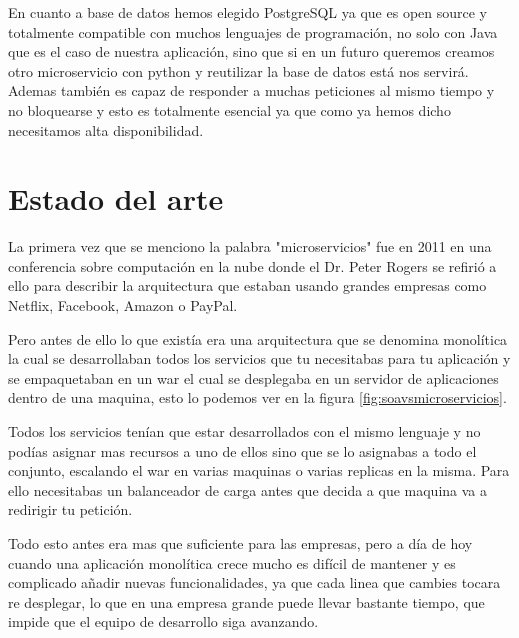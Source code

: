 \documentclass[12pt]{report} %
\begin{document}
	En cuanto a base de datos hemos elegido PostgreSQL ya que es open source y totalmente compatible con muchos lenguajes de programación, no solo con Java que es el caso de nuestra aplicación, sino que si en un futuro queremos creamos otro microservicio con python y reutilizar la base de datos está nos servirá.
	Ademas también es capaz de responder a muchas peticiones al mismo tiempo y no bloquearse y esto es totalmente esencial ya que como ya hemos dicho necesitamos alta disponibilidad.
	 
	\section{Estado del arte}
	
	La primera vez que se menciono la palabra "microservicios" fue en 2011 en una conferencia sobre computación en la nube donde el Dr. Peter Rogers\cite{breveHistoria} se refirió a ello para describir la arquitectura que estaban usando grandes empresas como Netflix, Facebook, Amazon o PayPal. 

	Pero antes de ello lo que existía era una arquitectura que se denomina monolítica la cual se desarrollaban todos los servicios que tu necesitabas para tu aplicación y se empaquetaban en un war el cual se desplegaba en un servidor de aplicaciones dentro de una maquina, esto lo podemos ver en la figura \ref{fig:soavsmicroservicios}.
	
	Todos los servicios tenían que estar desarrollados con el mismo lenguaje y no podías asignar mas recursos a uno de ellos sino que se lo asignabas a todo el conjunto, escalando el war en varias maquinas o varias replicas en la misma. Para ello necesitabas un balanceador de carga antes que decida a que maquina va a redirigir tu petición.
	
	Todo esto antes era mas que suficiente para las empresas, pero a día de hoy cuando una aplicación monolítica crece mucho es difícil de mantener y es complicado añadir nuevas funcionalidades, ya que cada linea que cambies tocara re desplegar, lo que en una empresa grande puede llevar bastante tiempo, que impide que el equipo de desarrollo siga avanzando.
	
	
	
\end{document}
